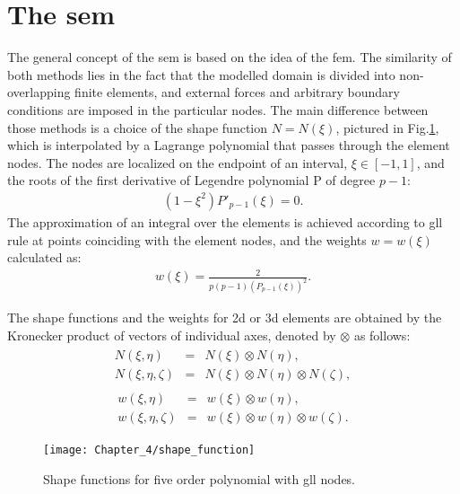 \section{The \acs{sem}}
\label{sec:sem}


The general concept of the \ac{sem} is based on the idea of the \ac{fem}.
The similarity of both methods lies in the fact that the modelled domain is divided into non-overlapping finite elements, and external forces and arbitrary boundary conditions are imposed in the particular nodes.
The main difference between those methods is a choice of the shape function \( N=N(\xi )\), pictured in Fig.\ref{fig:shape}, which is interpolated by a Lagrange polynomial that passes through the element nodes.
The nodes are localized on the endpoint of an interval, \(\xi\in[-1,1]\), and the roots of the first derivative of Legendre polynomial P of degree \(p-1\):
\begin{eqnarray}
	(1-\xi^2)P'_{p-1}(\xi)=0.
	\label{eq:nodes}
\end{eqnarray}
The approximation of an integral over the elements is achieved according to \ac{gll} rule at points coinciding with the element nodes, 
and the weights \(w=w(\xi)\) calculated as:
\begin{eqnarray}
	{w(\xi)} = \frac{2}{p(p-1)(P_{p-1}(\xi))^2}.
	\label{eq:weight}
\end{eqnarray}

The shape functions and the weights for \ac{2d} or \ac{3d} elements are obtained by the Kronecker product of vectors of individual axes, denoted by \(\otimes\) as follows:
\begin{eqnarray}
	\begin{array}{rcl}
	N(\xi,\eta) & = & N(\xi)\otimes N(\eta),\\
	N(\xi,\eta,\zeta) & = & N(\xi)\otimes N(\eta)\otimes N(\zeta),
	\end{array}
\label{eq:shape_functions}
\end{eqnarray}
%
\begin{eqnarray}
	\begin{array}{rcl}
	w(\xi,\eta) & = & w(\xi)\otimes w(\eta),\\
	w(\xi,\eta,\zeta) & = & w(\xi)\otimes w(\eta)\otimes w(\zeta).
	\end{array}
	\label{eq:weights}
\end{eqnarray}
\begin{figure}[H]
	\begin{center}
		\texttt{[image: Chapter\_4/shape\_function]}
	\end{center}
	\caption{Shape functions for five order polynomial with \acf{gll} nodes.}
	\label{fig:shape}
\end{figure}

